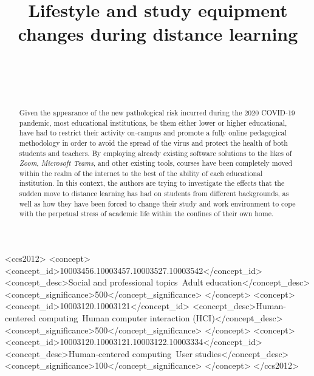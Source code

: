 \documentclass{sigchi}
\def\plaintitle{Lifestyle and study equipment changes during distance learning}
\begin{document}
\title{\plaintitle}
\author{
  \\
  \\
  \\
}
\maketitle

\begin{abstract}
Given the appearance of the new pathological risk incurred during the 2020 COVID-19 pandemic, most educational institutions, be them either lower or higher educational, have had to restrict their activity on-campus and promote a fully online pedagogical methodology in order to avoid the spread of the virus and protect the health of both students and teachers. By employing already existing software solutions to the likes of \emph{Zoom}, \emph{Microsoft Teams}, and other existing tools, courses have been completely moved within the realm of the internet to the best of the ability of each educational institution. In this context, the authors are trying to investigate the effects that the sudden move to distance learning has had on students from different backgrounds, as well as how they have been forced to change their study and work environment to cope with the perpetual stress of academic life within the confines of their own home.
\end{abstract}

\begin{CCSXML}
<ccs2012>
<concept>
<concept_id>10003456.10003457.10003527.10003542</concept_id>
<concept_desc>Social and professional topics~Adult education</concept_desc>
<concept_significance>500</concept_significance>
</concept>
<concept>
<concept_id>10003120.10003121</concept_id>
<concept_desc>Human-centered computing~Human computer interaction (HCI)</concept_desc>
<concept_significance>500</concept_significance>
</concept>
<concept>
<concept_id>10003120.10003121.10003122.10003334</concept_id>
<concept_desc>Human-centered computing~User studies</concept_desc>
<concept_significance>100</concept_significance>
</concept>
</ccs2012>
\end{CCSXML}
\end{document}
